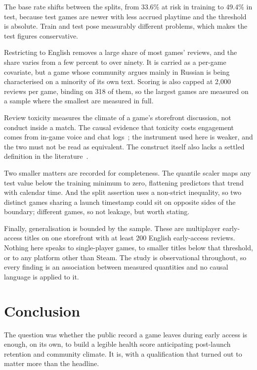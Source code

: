 \documentclass[sigconf]{acmart}
\begin{document}
The base rate shifts between the splits, from 33.6\% at risk in training to 49.4\% in test, because
test games are newer with less accrued playtime and the threshold is absolute. Train and test pose
measurably different problems, which makes the test figures conservative.

Restricting to English removes a large share of most games' reviews, and the share varies from a
few percent to over ninety. It is carried as a per-game covariate, but a game whose community
argues mainly in Russian is being characterised on a minority of its own text. Scoring is also
capped at 2,000 reviews per game, binding on 318 of them, so the largest games are measured on a
sample where the smallest are measured in full.

Review toxicity measures the climate of a game's storefront discussion, not conduct inside a match.
The causal evidence that toxicity costs engagement comes from in-game voice and chat
logs~\cite{Morrier2025}; the instrument used here is weaker, and the two must not be read as
equivalent. The construct itself also lacks a settled definition in the
literature~\cite{Kordyaka2025}.

Two smaller matters are recorded for completeness. The quantile scaler maps any test value below
the training minimum to zero, flattening predictors that trend with calendar time. And the split
assertion uses a non-strict inequality, so two distinct games sharing a launch timestamp could sit
on opposite sides of the boundary; different games, so not leakage, but worth stating.

Finally, generalisation is bounded by the sample. These are multiplayer early-access titles on one
storefront with at least 200 English early-access reviews. Nothing here speaks to single-player
games, to smaller titles below that threshold, or to any platform other than Steam. The study is
observational throughout, so every finding is an association between measured quantities and no
causal language is applied to it.

\section{Conclusion}
\label{sec:conclusion}

The question was whether the public record a game leaves during early access is enough, on its own,
to build a legible health score anticipating post-launch retention and community climate. It is,
with a qualification that turned out to matter more than the headline.
\end{document}
